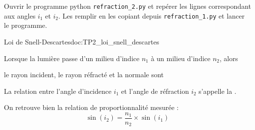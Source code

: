 
\mesure
Ouvrir le programme python \texttt{refraction\_2.py} et repérer les lignes correspondant aux angles $i_1$ et $i_2$.
Les remplir en les copiant depuis \texttt{refraction\_1.py} et lancer le programme.



\begin{doc}{Loi de Snell-Descartes}{doc:TP2_loi_snell_descartes}
  \begin{importants}
    Lorsque la lumière passe d'un milieu d'indice $n_1$ à un milieu d'indice $n_2$, alors
    \begin{listePoints}
      \item le rayon incident, le rayon réfracté et la normale sont 
      \item \;
      \item \;
    \end{listePoints}
    
    La relation entre l'angle d'incidence $i_1$ et l'angle de réfraction $i_2$ s'appelle la .
  \end{importants}
  
  On retrouve bien la relation de proportionnalité mesurée :
  \begin{equation*}
    \sin(i_2) = \dfrac{n_1}{n_2} \times \sin(i_1)
  \end{equation*}
\end{doc}

